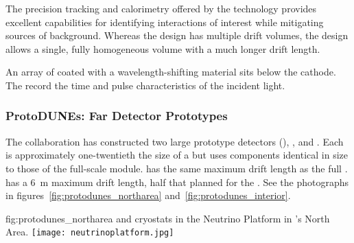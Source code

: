 The precision tracking and calorimetry offered by the  technology provides excellent capabilities for identifying interactions of interest while mitigating sources of background.  Whereas the  design has multiple drift volumes, the  design allows a single, fully homogeneous  volume with a much longer drift length.

An array of  coated with a wavelength-shifting material sits below the cathode. The  record  the time and pulse characteristics of the incident light.



\FloatBarrier

\subsubsection{ProtoDUNEs: Far Detector Prototypes}

The  collaboration has constructed 
two large prototype detectors (), , and .  %
 Each is approximately one-twentieth the size of a   but uses components identical in size to those of the full-scale module.  has the same \spmaxdrift maximum drift length as the full .  has a \SI{6}{m} maximum drift length, half that planned for the . See the photographs in figures~\ref{fig:protodunes_northarea} and~\ref{fig:protodunes_interior}.

\begin{dunefigure}
{fig:protodunes_northarea}
{ and  cryostats in the  Neutrino Platform in 's North Area.}
\texttt{[image: neutrinoplatform.jpg]}
\end{dunefigure}

